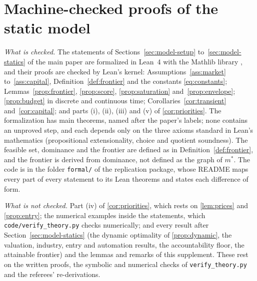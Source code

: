 
\section{Machine-checked proofs of the static model}\label{supp:formal}

\emph{What is checked.} The statements of Sections~\ref{sec:model-setup} to~\ref{sec:model-statics} of the main paper are formalized in Lean~4 \citep{moura2021lean4} with the Mathlib library \citep{mathlib2020}, and their proofs are checked by Lean's kernel: Assumptions~\ref{ass:market} to~\ref{ass:capital}, Definition~\ref{def:frontier} and the constants \eqref{eq:constants}; Lemmas~\ref{prop:frontier}, \ref{prop:score}, \ref{prop:saturation} and~\ref{prop:envelope}; \autoref{prop:budget} in discrete and continuous time; Corollaries~\ref{cor:transient} and~\ref{cor:capital}; and parts (i), (ii), (iii) and (v) of \autoref{cor:priorities}. The formalization has \FormalNThm{} main theorems, named after the paper's labels; none contains an unproved step, and each depends only on the three axioms standard in Lean's mathematics (propositional extensionality, choice and quotient soundness). The feasible set, dominance and the frontier are defined as in Definition~\ref{def:frontier}, and the frontier is derived from dominance, not defined as the graph of $m^*$. The code is in the folder \texttt{formal/} of the replication package, whose README maps every part of every statement to its Lean theorems and states each difference of form.

\emph{What is not checked.} Part (iv) of \autoref{cor:priorities}, which rests on \autoref{lem:prices} and \autoref{prop:entry}; the numerical examples inside the statements, which \texttt{code/verify\_theory.py} checks numerically; and every result after Section~\ref{sec:model-statics} (the dynamic optimality of \autoref{prop:dynamic}, the valuation, industry, entry and automation results, the accountability floor, the attainable frontier) and the lemmas and remarks of this supplement. These rest on the written proofs, the symbolic and numerical checks of \texttt{verify\_theory.py} and the referees' re-derivations.


